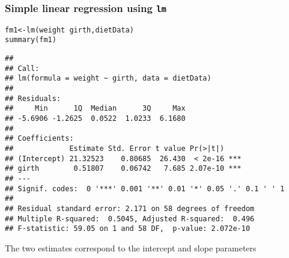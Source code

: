 \documentclass[color=usenames,dvipsnames]{beamer}\usepackage[]{graphicx}\usepackage[]{color}
\makeatletter
\newcommand{\hlopt}[1]{\textcolor[rgb]{0,0,0}{#1}}%
\newcommand{\hlstd}[1]{\textcolor[rgb]{0,0,0}{#1}}%
\newcommand{\hlkwb}[1]{\textcolor[rgb]{0,0.341,0.682}{#1}}%
\newcommand{\hlkwd}[1]{\textcolor[rgb]{0.004,0.004,0.506}{#1}}%
\newenvironment{kframe}{%
 \def\at@end@of@kframe{}%
 \ifinner\ifhmode%
  \def\at@end@of@kframe{\end{minipage}}%
  \begin{minipage}{\columnwidth}%
 \fi\fi%
 \def\FrameCommand##1{\hskip\@totalleftmargin \hskip-\fboxsep
 \colorbox{shadecolor}{##1}\hskip-\fboxsep
     \hskip-\linewidth \hskip-\@totalleftmargin \hskip\columnwidth}%
 \MakeFramed {\advance\hsize-\width
   \@totalleftmargin\z@ \linewidth\hsize
   \@setminipage}}%
 {\par\unskip\endMakeFramed%
 \at@end@of@kframe}
\newenvironment{knitrout}{}{} %
\makeatother
\begin{document}
\begin{frame}[fragile]
  \frametitle{Simple linear regression using {\tt lm}}
  \scriptsize

\begin{knitrout}
\color{fgcolor}\begin{kframe}
\begin{alltt}
\hlstd{fm1} \hlkwb{<-} \hlkwd{lm}\hlstd{(weight} \hlopt{~} \hlstd{girth, dietData)}
\hlkwd{summary}\hlstd{(fm1)}
\end{alltt}
\begin{verbatim}
## 
## Call:
## lm(formula = weight ~ girth, data = dietData)
## 
## Residuals:
##     Min      1Q  Median      3Q     Max 
## -5.6906 -1.2625  0.0522  1.0233  6.1680 
## 
## Coefficients:
##             Estimate Std. Error t value Pr(>|t|)    
## (Intercept) 21.32523    0.80685  26.430  < 2e-16 ***
## girth        0.51807    0.06742   7.685 2.07e-10 ***
## ---
## Signif. codes:  0 '***' 0.001 '**' 0.01 '*' 0.05 '.' 0.1 ' ' 1
## 
## Residual standard error: 2.171 on 58 degrees of freedom
## Multiple R-squared:  0.5045,	Adjusted R-squared:  0.496 
## F-statistic: 59.05 on 1 and 58 DF,  p-value: 2.072e-10
\end{verbatim}
\end{kframe}
\end{knitrout}
\pause
{The two estimates correspond to the intercept and slope parameters}
\end{frame}
\end{document}
